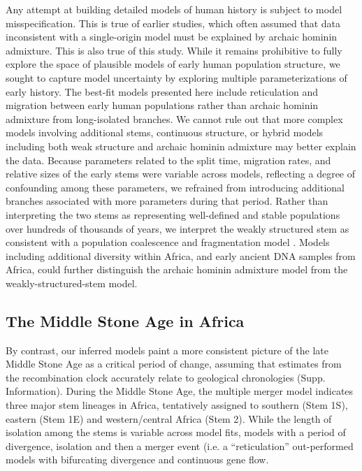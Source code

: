 \documentclass[]{article}
\begin{document}
Any attempt at building detailed models of human history is subject to model
misspecification. This is true of earlier studies, which often assumed that
data inconsistent with a single-origin model must be explained by archaic
hominin admixture. This is also true of this study. While it remains prohibitive to
fully explore the space of plausible models of early human population structure,
we sought to capture model uncertainty by exploring multiple parameterizations of
early history.
The best-fit models presented here include reticulation and migration between
early human populations rather than archaic hominin admixture from long-isolated branches.
We cannot rule out that more complex models involving
additional stems, continuous structure, or hybrid models including both weak structure and archaic
hominin admixture may better explain the data. Because parameters related to the split
time, migration rates, and relative sizes of the early stems were variable
across models, reflecting a degree of confounding among these parameters, we
refrained from introducing additional branches associated with more
parameters during that period.
Rather than interpreting the two stems as representing well-defined
and stable populations over hundreds of thousands of years, we interpret the
weakly structured stem as consistent with a population coalescence and
fragmentation model \citep{Scerri2019-xg}.
Models including additional diversity within Africa,
and early ancient DNA samples from Africa, could further distinguish
the archaic hominin admixture model from the weakly-structured-stem model.

\subsection*{The Middle Stone Age in Africa}

By contrast, our inferred models paint a more consistent picture of the late
Middle Stone Age as a critical period of change, assuming that estimates from
the recombination clock accurately relate to geological chronologies
(Supp. Information).
During the Middle Stone Age, the multiple merger model indicates three
major stem lineages in Africa, tentatively assigned to southern (Stem 1S),
eastern (Stem 1E) and western/central Africa (Stem 2). While the length of
isolation among the stems is variable across model fits, models with a period of 
divergence, isolation and then a merger event (i.e. a ``reticulation''
out-performed models with bifurcating divergence and continuous gene flow. 
\end{document}
